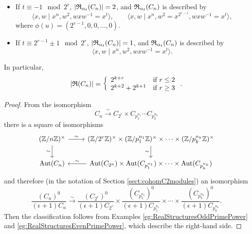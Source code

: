 \begin{cor}
\begin{enumerate}
\begin{itemize}
  \item If $t \equiv -1 \!\! \mod 2^r$, $|{\mathfrak R}_{\alpha_t}(C_n)| = 2$, and ${\mathfrak R}_{\alpha_t}(C_n)$ is described by
    \[
    \langle x , w \mid x^n, w^2, wxw^{-1} = x^t \rangle, \qquad \langle x , w \mid x^n, w^2 = x^{2^{r-1}}, wxw^{-1} = x^t \rangle,
  \]
  where $\phi(u) = (2^{r-1},0,0, ... , 0)$.
  \item If $t \equiv 2^{r-1} \pm 1 \!\! \mod 2^r$, $|{\mathfrak R}_{\alpha_t}(C_n)| = 1$, and ${\mathfrak R}_{\alpha_t}(C_n)$ is described by
    \[
    \langle x , w \mid x^n, w^2, wxw^{-1} = x^t \rangle.
  \]
  \end{itemize}
\end{enumerate}
In particular, 
\[
|{\mathfrak R}(C_n)| = \left\{ \begin{array}{ll} 2^{k+r} & \mbox{if } r \leq 2 \\ 2^{k+2} + 2^{k+1} & \mbox{if } r \geq 3 \end{array} \right..
\]
\end{cor}

\begin{proof}
  From the isomorphism
  \[
  C_n \xrightarrow{\sim} C_{2^r} \times C_{p_1^{n_1}} \cdots C_{p_k^{n_k}} 
  \]
  there is a square of isomorphisms
\[\begin{tikzcd}
	{(\bZ / n\bZ)^{\times}} & {(\bZ / 2^r \bZ)^{\times} \times (\bZ / p_1^{n_1} \bZ)^{\times} \times \cdots \times (\bZ / p_k^{n_k} \bZ)^{\times}} \\
	{\Aut(C_n)} & {\Aut(C_{2^n}) \times \Aut(C_{p_1^{n_1}}) \times \cdots \times \Aut(C_{p_k^{n_k}}) }
	\arrow["\sim", from=1-1, to=1-2]
	\arrow["\sim"', from=1-1, to=2-1]
	\arrow["\sim"', from=1-2, to=2-2]
	\arrow["\sim"', from=2-2, to=2-1]
\end{tikzcd}\] 
and therefore (in the notation of Section \ref{sect:cohomC2modules}) an isomorphism
\[
\frac{(C_n)^0}{(\epsilon + 1)C_n} \xrightarrow{\sim} \frac{(C_{2^r})^0}{(\epsilon + 1)C_{2^r}} \times \frac{(C_{p_1^{n_1}})^0}{(\epsilon + 1)C_{p_1^{n_1}}} \times \cdots \times \frac{(C_{p_k^{n_k}})^0}{(\epsilon + 1)C_{p_k^{n_k}}}.
\]
Then the classification follows from Examples \ref{eg:RealStructuresOddPrimePower} and \ref{eg:RealStructuresEvenPrimePower}, which describe the right-hand side. 
\end{proof}

